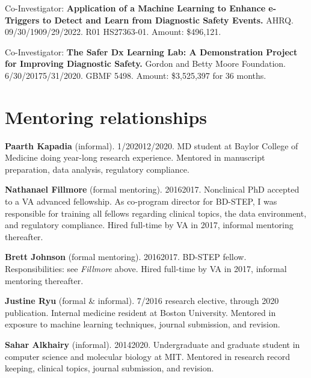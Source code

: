 \documentclass[10pt]{article}
\begin{document}
Co-Investigator: \textbf{Application of a Machine Learning to Enhance
  e-Triggers to Detect and Learn from Diagnostic Safety Events.} AHRQ.
09/30/19\ndash{}09/29/2022. R01 HS27363-01. Amount: \$496,121.

Co-Investigator: \textbf{The Safer Dx Learning Lab: A Demonstration
  Project for Improving Diagnostic Safety.} Gordon and Betty Moore
Foundation. 6/30/2017\ndash{}5/31/2020. GBMF 5498. Amount: \$3,525,397
for 36 months.


\section*{Mentoring relationships} %

\textbf{Paarth Kapadia} (informal). 1/2020\ndash{}12/2020. MD student
at Baylor College of Medicine doing year-long research experience.
Mentored in manuscript preparation, data analysis, regulatory
compliance.

\textbf{Nathanael Fillmore} (formal mentoring). 2016\ndash{}2017.
Nonclinical PhD accepted to a VA advanced fellowship. As co-program
director for BD-STEP, I was responsible for training all fellows
regarding clinical topics, the data environment, and regulatory
compliance. Hired full-time by VA in 2017, informal mentoring
thereafter.

\textbf{Brett Johnson} (formal mentoring). 2016\ndash{}2017. BD-STEP
fellow. Responsibilities: see \emph{Fillmore} above. Hired full-time
by VA in 2017, informal mentoring thereafter.

\textbf{Justine Ryu} (formal \& informal). 7/2016 research elective,
through 2020 publication. Internal medicine resident at Boston
University. Mentored in exposure to machine learning techniques,
journal submission, and revision.

\textbf{Sahar Alkhairy} (informal). 2014\ndash{}2020. Undergraduate
and graduate student in computer science and molecular biology at MIT.
Mentored in research record keeping, clinical topics, journal
submission, and revision.
\end{document}
